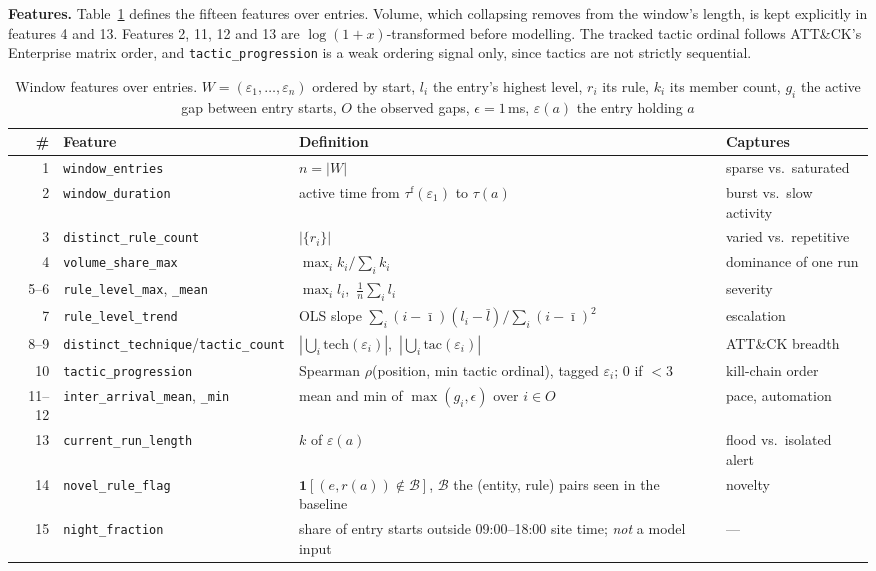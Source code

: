 \documentclass[conference]{IEEEtran}
\begin{document}
\textbf{Features.} Table~\ref{tab:features} defines the fifteen features over entries. Volume, which collapsing removes from the window's length, is kept explicitly in features 4 and 13. Features 2, 11, 12 and 13 are $\log(1+x)$-transformed before modelling. The tracked tactic ordinal follows ATT\&CK's Enterprise matrix order, and \texttt{tactic\_progression} is a weak ordering signal only, since tactics are not strictly sequential.

\begin{table}[t]
\caption{Window features over entries. $W = (\varepsilon_1,\dots,\varepsilon_n)$ ordered by start, $l_i$ the entry's highest level, $r_i$ its rule, $k_i$ its member count, $g_i$ the active gap between entry starts, $O$ the observed gaps, $\epsilon = 1$\,ms, $\varepsilon(a)$ the entry holding $a$}
\label{tab:features}
\centering\footnotesize
\begin{tabular}{@{}rlll@{}}
\toprule
\textbf{\#} & \textbf{Feature} & \textbf{Definition} & \textbf{Captures} \\
\midrule
1 & \texttt{window\_entries} & $n = |W|$ & sparse vs.\ saturated \\
2 & \texttt{window\_duration} & active time from $\tau^{\mathrm{f}}(\varepsilon_1)$ to $\tau(a)$ & burst vs.\ slow activity \\
3 & \texttt{distinct\_rule\_count} & $|\{r_i\}|$ & varied vs.\ repetitive \\
4 & \texttt{volume\_share\_max} & $\max_i k_i / \sum_i k_i$ & dominance of one run \\
5--6 & \texttt{rule\_level\_max}, \texttt{\_mean} & $\max_i l_i$,\ $\frac{1}{n}\sum_i l_i$ & severity \\
7 & \texttt{rule\_level\_trend} & OLS slope $\sum_i (i-\bar\imath)(l_i-\bar l) / \sum_i (i-\bar\imath)^2$ & escalation \\
8--9 & \texttt{distinct\_technique}/\texttt{tactic\_count} & $|\bigcup_i \mathrm{tech}(\varepsilon_i)|$,\ $|\bigcup_i \mathrm{tac}(\varepsilon_i)|$ & ATT\&CK breadth \\
10 & \texttt{tactic\_progression} & Spearman $\rho$(position, min tactic ordinal), tagged $\varepsilon_i$; 0 if $<3$ & kill-chain order \\
11--12 & \texttt{inter\_arrival\_mean}, \texttt{\_min} & mean and min of $\max(g_i,\epsilon)$ over $i \in O$ & pace, automation \\
13 & \texttt{current\_run\_length} & $k$ of $\varepsilon(a)$ & flood vs.\ isolated alert \\
14 & \texttt{novel\_rule\_flag} & $\mathbf{1}[(e, r(a)) \notin \mathcal{B}]$, $\mathcal{B}$ the (entity, rule) pairs seen in the baseline & novelty \\
15 & \texttt{night\_fraction} & share of entry starts outside 09:00--18:00 site time; \emph{not} a model input & --- \\
\bottomrule
\end{tabular}
\end{table}
\end{document}
